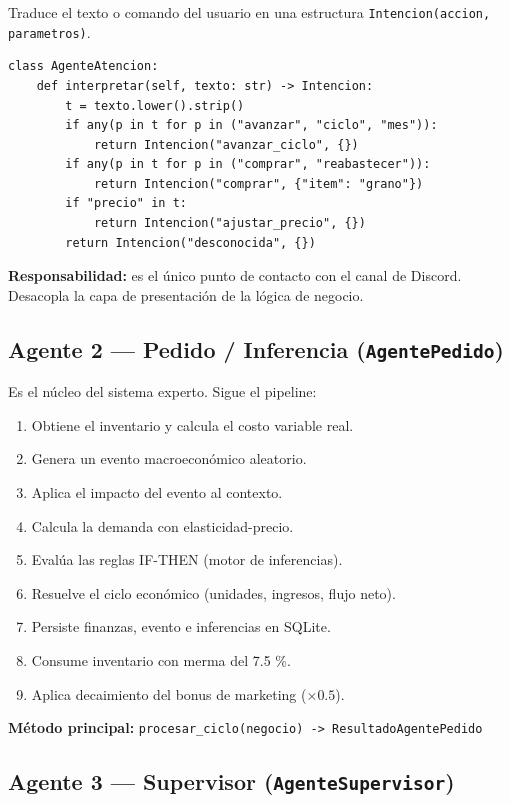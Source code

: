 \documentclass[12pt,spanish]{article}
\begin{document}
Traduce el texto o comando del usuario en una estructura
\texttt{Intencion(accion, parametros)}.

\begin{lstlisting}[style=python]
class AgenteAtencion:
    def interpretar(self, texto: str) -> Intencion:
        t = texto.lower().strip()
        if any(p in t for p in ("avanzar", "ciclo", "mes")):
            return Intencion("avanzar_ciclo", {})
        if any(p in t for p in ("comprar", "reabastecer")):
            return Intencion("comprar", {"item": "grano"})
        if "precio" in t:
            return Intencion("ajustar_precio", {})
        return Intencion("desconocida", {})
\end{lstlisting}


\textbf{Responsabilidad:} es el único punto de contacto con el canal de Discord.
Desacopla la capa de presentación de la lógica de negocio.

\subsection*{Agente 2 — Pedido / Inferencia (\texttt{AgentePedido})}

Es el núcleo del sistema experto. Sigue el pipeline:

\begin{enumerate}
  \item Obtiene el inventario y calcula el costo variable real.
  \item Genera un evento macroeconómico aleatorio.
  \item Aplica el impacto del evento al contexto.
  \item Calcula la demanda con elasticidad-precio.
  \item Evalúa las reglas IF-THEN (motor de inferencias).
  \item Resuelve el ciclo económico (unidades, ingresos, flujo neto).
  \item Persiste finanzas, evento e inferencias en SQLite.
  \item Consume inventario con merma del 7.5 \%.
  \item Aplica decaimiento del bonus de marketing ($\times 0.5$).
\end{enumerate}

\textbf{Método principal:} \texttt{procesar\_ciclo(negocio) -> ResultadoAgentePedido}

\subsection*{Agente 3 — Supervisor (\texttt{AgenteSupervisor})}
\end{document}
